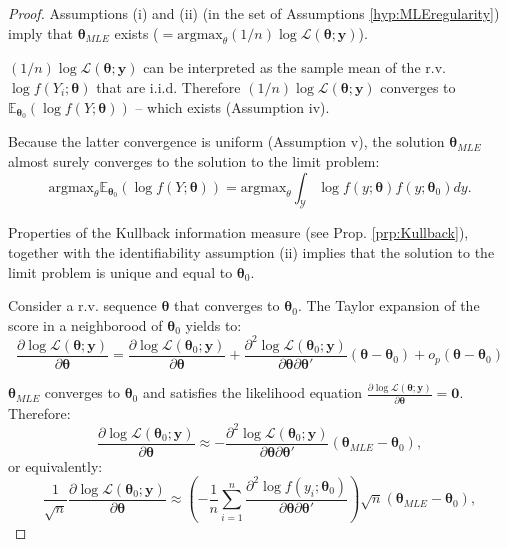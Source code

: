 \documentclass[
]{book}
\theoremstyle{definition}
\theoremstyle{definition}
\theoremstyle{definition}
\theoremstyle{definition}
\theoremstyle{remark}
\begin{document}
\begin{proof}
Assumptions (i) and (ii) (in the set of Assumptions \ref{hyp:MLEregularity}) imply that \(\boldsymbol\theta_{MLE}\) exists (\(=\mbox{argmax}_\theta (1/n)\log \mathcal{L}(\boldsymbol\theta;\mathbf{y})\)).

\((1/n)\log \mathcal{L}(\boldsymbol\theta;\mathbf{y})\) can be interpreted as the sample mean of the r.v. \(\log f(Y_i;\boldsymbol\theta)\) that are i.i.d. Therefore \((1/n)\log \mathcal{L}(\boldsymbol\theta;\mathbf{y})\) converges to \(\mathbb{E}_{\boldsymbol\theta_0}(\log f(Y;\boldsymbol\theta))\) -- which exists (Assumption iv).

Because the latter convergence is uniform (Assumption v), the solution \(\boldsymbol\theta_{MLE}\) almost surely converges to the solution to the limit problem:
\[
\mbox{argmax}_\theta \mathbb{E}_{\boldsymbol\theta_0}(\log f(Y;\boldsymbol\theta)) = \mbox{argmax}_\theta \int_{\mathcal{Y}} \log f(y;\boldsymbol\theta)f(y;\boldsymbol\theta_0) dy.
\]

Properties of the Kullback information measure (see Prop. \ref{prp:Kullback}), together with the identifiability assumption (ii) implies that the solution to the limit problem is unique and equal to \(\boldsymbol\theta_0\).

Consider a r.v. sequence \(\boldsymbol\theta\) that converges to \(\boldsymbol\theta_0\). The Taylor expansion of the score in a neighborood of \(\boldsymbol\theta_0\) yields to:
\[
\frac{\partial \log \mathcal{L}(\boldsymbol\theta;\mathbf{y})}{\partial \boldsymbol\theta} = \frac{\partial \log \mathcal{L}(\boldsymbol\theta_0;\mathbf{y})}{\partial \boldsymbol\theta} + \frac{\partial^2 \log \mathcal{L}(\boldsymbol\theta_0;\mathbf{y})}{\partial \boldsymbol\theta \partial \boldsymbol\theta'}(\boldsymbol\theta - \boldsymbol\theta_0) + o_p(\boldsymbol\theta - \boldsymbol\theta_0)
\]

\(\boldsymbol\theta_{MLE}\) converges to \(\boldsymbol\theta_0\) and satisfies the likelihood equation \(\frac{\partial \log \mathcal{L}(\boldsymbol\theta;\mathbf{y})}{\partial \boldsymbol\theta} = \mathbf{0}\). Therefore:
\[
\frac{\partial \log \mathcal{L}(\boldsymbol\theta_0;\mathbf{y})}{\partial \boldsymbol\theta} \approx - \frac{\partial^2 \log \mathcal{L}(\boldsymbol\theta_0;\mathbf{y})}{\partial \boldsymbol\theta \partial \boldsymbol\theta'}(\boldsymbol\theta_{MLE} - \boldsymbol\theta_0),
\]
or equivalently:
\[
\frac{1}{\sqrt{n}} \frac{\partial \log \mathcal{L}(\boldsymbol\theta_0;\mathbf{y})}{\partial \boldsymbol\theta} \approx
\left(- \frac{1}{n} \sum_{i=1}^n \frac{\partial^2 \log f(y_i;\boldsymbol\theta_0)}{\partial \boldsymbol\theta \partial \boldsymbol\theta'} \right)\sqrt{n}(\boldsymbol\theta_{MLE} - \boldsymbol\theta_0),
\]


\end{proof}
\end{document}

